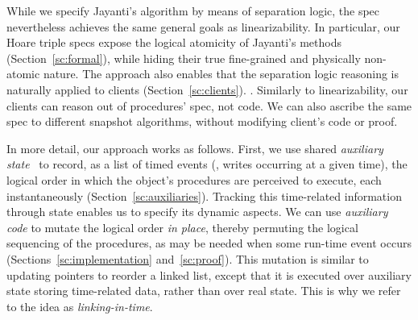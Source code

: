 While we specify Jayanti's algorithm by means of separation logic, the
spec nevertheless achieves the same general goals as
linearizability. In particular, our Hoare triple specs expose the
logical atomicity of Jayanti's methods (Section~\ref{sc:formal}),
while hiding their true fine-grained and physically non-atomic nature.
The approach also enables that the separation logic reasoning is
naturally applied to clients
(Section~\ref{sc:clients}). .
Similarly to linearizability, our clients can reason out of
procedures' spec, not code. We can also ascribe the same spec to
different snapshot algorithms, without modifying client's code or
proof.


In more detail, our approach works as follows. First, we use shared
\emph{auxiliary state}~\cite{OwickiG+CACM76} to record, as a list
of timed events (\eg, writes occurring at a given time), the logical
order in which the object's procedures are perceived to execute, each
instantaneously (Section~\ref{sc:auxiliaries}). Tracking this
time-related information through state enables us to specify its
dynamic aspects. We can use \emph{auxiliary code} to mutate the
logical order \emph{in place}, thereby permuting the logical
sequencing of the procedures, as may be needed when some run-time
event occurs (Sections~\ref{sc:implementation}
and~\ref{sc:proof}). This mutation is similar to updating pointers to
reorder a linked list, except that it is executed over auxiliary state
storing time-related data, rather than over real state. This is why we
refer to the idea as \emph{linking-in-time}.

